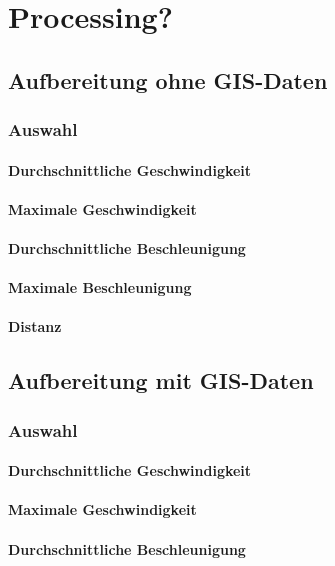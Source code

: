 \chapter{Processing?}


\section{Aufbereitung ohne GIS-Daten}
\subsection{Auswahl}
\subsubsection{Durchschnittliche Geschwindigkeit}
\subsubsection{Maximale Geschwindigkeit}
\subsubsection{Durchschnittliche Beschleunigung}
\subsubsection{Maximale Beschleunigung}
\subsubsection{Distanz}
\clearpage

\section{Aufbereitung mit GIS-Daten}
\subsection{Auswahl}
\subsubsection{Durchschnittliche Geschwindigkeit}
\subsubsection{Maximale Geschwindigkeit}
\subsubsection{Durchschnittliche Beschleunigung}

